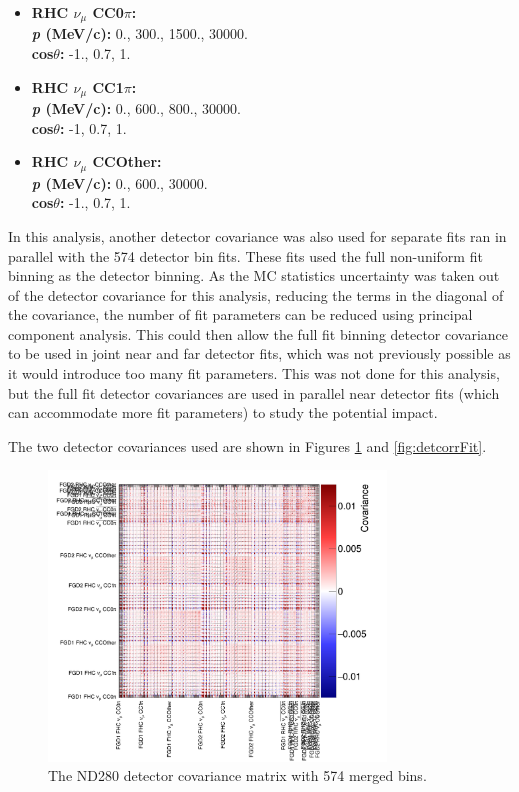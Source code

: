 \begin{itemize}
\item \textbf{RHC $\nu_{\mu}$ CC0$\pi$:}\\
\textbf{\textit{p} (MeV/c):} 0., 300., 1500., 30000.\\
\textbf{cos$\theta$:} -1., 0.7, 1.

\item \textbf{RHC $\nu_{\mu}$ CC1$\pi$:}\\
\textbf{\textit{p} (MeV/c):} 0., 600., 800., 30000.\\
\textbf{cos$\theta$:} -1, 0.7, 1.

\item \textbf{RHC $\nu_{\mu}$ CCOther:}\\
\textbf{\textit{p} (MeV/c):} 0., 600., 30000.\\
\textbf{cos$\theta$:} -1., 0.7, 1.

\end{itemize}

In this analysis, another detector covariance was also used for separate fits ran in parallel with the 574 detector bin fits. These fits used the full non-uniform fit binning as the detector binning. As the MC statistics uncertainty was taken out of the detector covariance for this analysis, reducing the terms in the diagonal of the covariance, the number of fit parameters can be reduced using principal component analysis. This could then allow the full fit binning detector covariance to be used in joint near and far detector fits, which was not previously possible as it would introduce too many fit parameters. This was not done for this analysis, but the full fit detector covariances are used in parallel near detector fits (which can accommodate more fit parameters) to study the potential impact.

The two detector covariances used are shown in Figures \ref{fig:detcorr574} and \ref{fig:detcorrFit}.

\begin{figure}[!htbp]
\centering
\includegraphics*[width=0.8\textwidth,clip]{figs/detcov574}
\caption{The ND280 detector covariance matrix with 574 merged bins.}\label{fig:detcorr574}
\end{figure}

